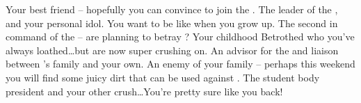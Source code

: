 \documentclass[char]{GL2020}
\begin{document}
\begin{itemz}[Notes]
	\item 
\end{itemz}
 
\begin{contacts}
	\contact{\cAmbition{}} Your best friend -- hopefully you can convince  to join the \pGoaties{}.
	\contact{\cChupLeader{}} The leader of the \pGoaties{}, and your personal idol. You want to be like \cChupLeader{\them} when you grow up.
	\contact{\cChupSecond{}} The second in command of the \pGoaties{} -- are \cChupSecond{} planning to betray \cChupLeader{}?
	\contact{\cHeir{}} Your childhood Betrothed who you've always loathed\ldots but are now super crushing on.
	\contact{\cDiplomat{}} An advisor for the \pTech{} and liaison between \cHeir{}'s family and your own.
	\contact{\cEvil{}} An enemy of your family -- perhaps this weekend you will find some juicy dirt that can be used against \cEvil{\them}.
	\contact{\cPresident{}} The student body president and your other crush\ldots You're pretty sure  like you back!
\end{contacts}
 
\end{document}
